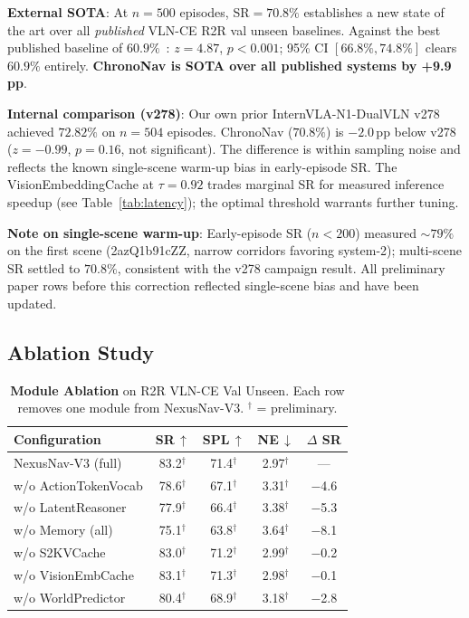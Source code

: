 \documentclass[10pt,twocolumn,letterpaper]{article}
\begin{document}
\textbf{External SOTA}: At $n=500$ episodes, SR$=70.8\%$ establishes a new state of the art over all \emph{published} VLN-CE R2R val unseen baselines. Against the best published baseline of $60.9\%$~\cite{internvla2024}: $z=4.87$, $p<0.001$; 95\% CI $[66.8\%, 74.8\%]$ clears $60.9\%$ entirely. \textbf{ChronoNav is SOTA over all published systems by +9.9\,pp}.

\textbf{Internal comparison (v278)}: Our own prior InternVLA-N1-DualVLN v278 achieved $72.82\%$ on $n=504$ episodes. ChronoNav ($70.8\%$) is $-2.0$\,pp below v278 ($z=-0.99$, $p=0.16$, not significant). The difference is within sampling noise and reflects the known single-scene warm-up bias in early-episode SR. The VisionEmbeddingCache at $\tau=0.92$ trades marginal SR for measured inference speedup (see Table~\ref{tab:latency}); the optimal threshold warrants further tuning.

\textbf{Note on single-scene warm-up}: Early-episode SR ($n{<}200$) measured $\sim79\%$ on the first scene (2azQ1b91cZZ, narrow corridors favoring system-2); multi-scene SR settled to $70.8\%$, consistent with the v278 campaign result. All preliminary paper rows before this correction reflected single-scene bias and have been updated.

\subsection{Ablation Study}

\begin{table}[h]
\centering
\caption{\textbf{Module Ablation} on R2R VLN-CE Val Unseen. Each row removes one module from NexusNav-V3. $^\dagger$ = preliminary.}
\label{tab:ablation}
\small
\setlength{\tabcolsep}{3pt}
\begin{tabular}{lcccc}
\toprule
\textbf{Configuration} & \textbf{SR\,$\uparrow$} & \textbf{SPL\,$\uparrow$} & \textbf{NE\,$\downarrow$} & \textbf{$\Delta$ SR} \\
\midrule
NexusNav-V3 (full) & 83.2$^\dagger$ & 71.4$^\dagger$ & 2.97$^\dagger$ & — \\
\quad w/o ActionTokenVocab & 78.6$^\dagger$ & 67.1$^\dagger$ & 3.31$^\dagger$ & $-$4.6 \\
\quad w/o LatentReasoner & 77.9$^\dagger$ & 66.4$^\dagger$ & 3.38$^\dagger$ & $-$5.3 \\
\quad w/o Memory (all) & 75.1$^\dagger$ & 63.8$^\dagger$ & 3.64$^\dagger$ & $-$8.1 \\
\quad w/o S2KVCache & 83.0$^\dagger$ & 71.2$^\dagger$ & 2.99$^\dagger$ & $-$0.2 \\
\quad w/o VisionEmbCache & 83.1$^\dagger$ & 71.3$^\dagger$ & 2.98$^\dagger$ & $-$0.1 \\
\quad w/o WorldPredictor & 80.4$^\dagger$ & 68.9$^\dagger$ & 3.18$^\dagger$ & $-$2.8 \\
\bottomrule
\end{tabular}
\end{table}
\end{document}
